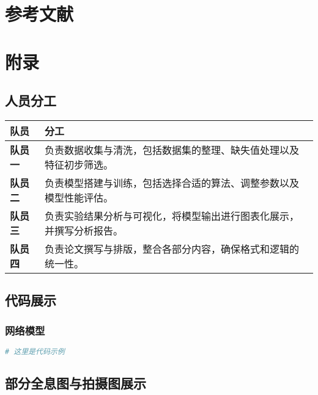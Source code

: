 \documentclass[a4paper]{report} %
\begin{document}
\chapter{参考文献}

\chapter{附录}
\section{人员分工}
\renewcommand{\arraystretch}{1.3} %
\begin{tabularx}{\textwidth}{>{\bfseries}l X}
\toprule
队员 & 分工 \\
\midrule
队员一 & 负责数据收集与清洗，包括数据集的整理、缺失值处理以及特征初步筛选。 \\
队员二 & 负责模型搭建与训练，包括选择合适的算法、调整参数以及模型性能评估。 \\
队员三 & 负责实验结果分析与可视化，将模型输出进行图表化展示，并撰写分析报告。 \\
队员四 & 负责论文撰写与排版，整合各部分内容，确保格式和逻辑的统一性。 \\
\bottomrule
\end{tabularx}

\section{代码展示}

\subsection{网络模型}
\begin{lstlisting}[language=Python, caption=生成器, label=code:generator]
# 这里是代码示例
\end{lstlisting}

\section{部分全息图与拍摄图展示}
\end{document}
